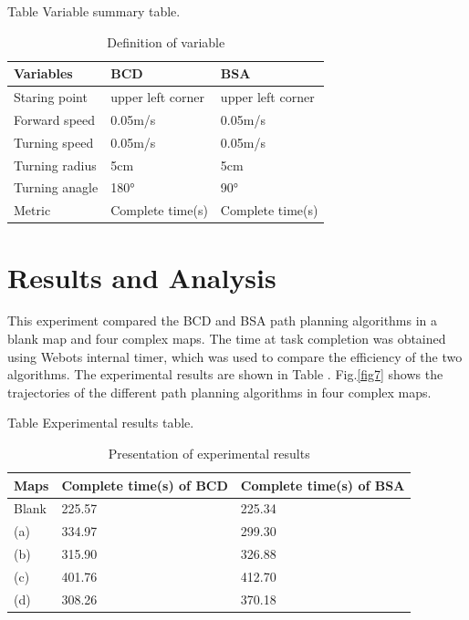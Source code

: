 \documentclass[conference]{IEEEtran}
\begin{document}
Table \uppercase\expandafter{} Variable summary table.
\begin{table}[htbp]
\centering
\setlength{\abovecaptionskip}{0.cm}
\caption{Definition of variable}
\label{Table1}
\begin{tabular}{lll}
\hline
Variables      & BCD               & BSA               \\\hline
Staring point  & upper left corner & upper left corner \\
Forward speed  & 0.05m/s           & 0.05m/s           \\
Turning speed  & 0.05m/s           & 0.05m/s           \\
Turning radius & 5cm               & 5cm               \\
Turning anagle & 180°              & 90°               \\
Metric         & Complete time(s)  & Complete time(s)  \\\hline
\end{tabular}
\end{table}


\section{Results and Analysis}

This experiment compared the BCD and BSA path planning algorithms in a blank map and four complex maps. The time at task completion was obtained using Webots internal timer, which was used to compare the efficiency of the two algorithms. The experimental results are shown in Table \uppercase\expandafter{}. Fig.\ref{fig7} shows the trajectories of the different path planning algorithms in four complex maps. 

Table \uppercase\expandafter{} Experimental results table.
\begin{table}[htbp]
\centering
\setlength{\abovecaptionskip}{0.cm}
\caption{Presentation of experimental results}
\label{Table1}
\begin{tabular}{lll}
\hline
Maps  & Complete time(s) of BCD & Complete time(s) of BSA \\\hline
Blank & 225.57                  & 225.34                  \\
(a)   & 334.97                  & 299.30                  \\
(b)   & 315.90                  & 326.88                  \\
(c)   & 401.76                  & 412.70                  \\
(d)   & 308.26                  & 370.18                  \\\hline
\end{tabular}
\end{table}
\end{document}

